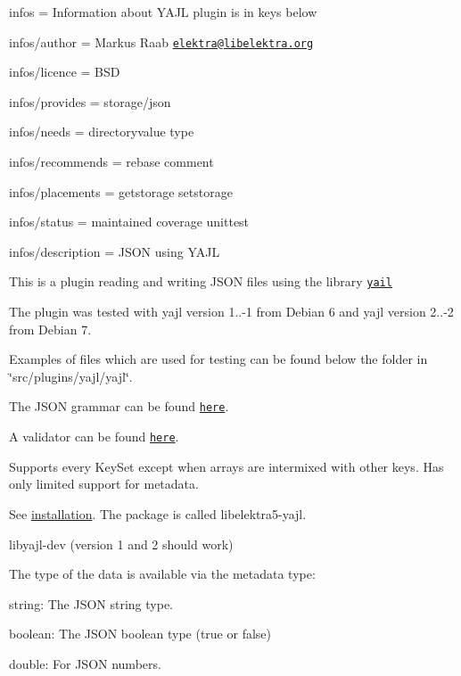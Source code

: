
\begin{DoxyItemize}
\item infos = Information about Y\+A\+JL plugin is in keys below
\item infos/author = Markus Raab \href{mailto:elektra@libelektra.org}{\tt elektra@libelektra.\+org}
\item infos/licence = B\+SD
\item infos/provides = storage/json
\item infos/needs = directoryvalue type
\item infos/recommends = rebase comment
\item infos/placements = getstorage setstorage
\item infos/status = maintained coverage unittest
\item infos/description = J\+S\+ON using Y\+A\+JL
\end{DoxyItemize}

This is a plugin reading and writing J\+S\+ON files using the library \href{http://lloyd.github.com/yajl/}{\tt yail}

The plugin was tested with yajl version 1..-\/1 from Debian 6 and yajl version 2..-\/2 from Debian 7.

Examples of files which are used for testing can be found below the folder in \char`\"{}src/plugins/yajl/yajl\char`\"{}.

The J\+S\+ON grammar can be found \href{http://www.json.org}{\tt here}.

A validator can be found \href{http://jsonlint.com/}{\tt here}.

Supports every Key\+Set except when arrays are intermixed with other keys. Has only limited support for metadata.

See \hyperlink{doc_INSTALL_md}{installation}. The package is called {\ttfamily libelektra5-\/yajl}.


\begin{DoxyItemize}
\item {\ttfamily libyajl-\/dev} (version 1 and 2 should work)
\end{DoxyItemize}

The type of the data is available via the metadata {\ttfamily type}\+:


\begin{DoxyItemize}
\item {\ttfamily string}\+: The J\+S\+ON string type.
\item {\ttfamily boolean}\+: The J\+S\+ON boolean type (true or false)
\item {\ttfamily double}\+: For J\+S\+ON numbers.
\end{DoxyItemize}

